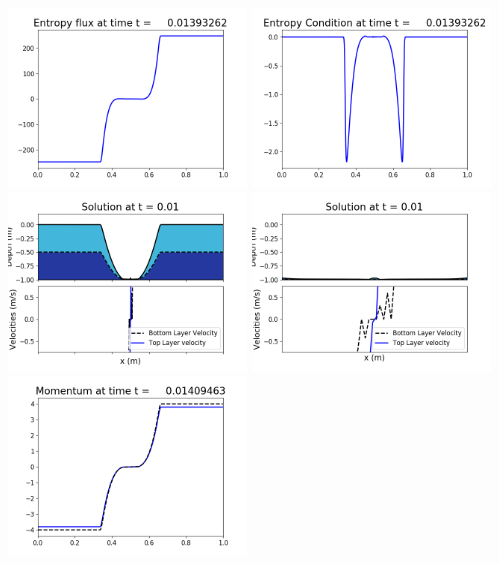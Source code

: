 \documentclass[11pt]{article}
\begin{document}
\includegraphics[width=0.475\textwidth]{frame0087fig1008.png}
\vskip 10pt 
\includegraphics[width=0.475\textwidth]{frame0087fig1009.png}
\vskip 10pt 
\includegraphics[width=0.475\textwidth]{frame0088fig1001.png}
\includegraphics[width=0.475\textwidth]{frame0088fig1002.png}
\vskip 10pt 
\includegraphics[width=0.475\textwidth]{frame0088fig1003.png}
\end{document}
